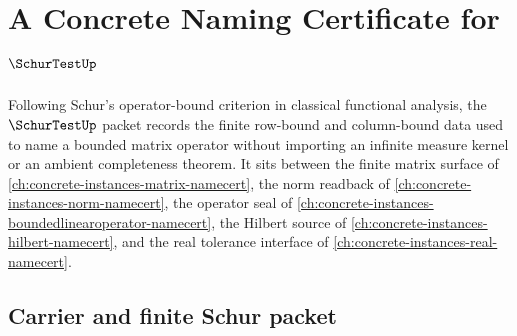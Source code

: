 \chapter{A Concrete Naming Certificate for $\SchurTestUp$}
\label{ch:concrete-instances-schur-test-namecert}

Following Schur's operator-bound criterion in classical functional analysis, the $\SchurTestUp$ packet records the finite row-bound and column-bound data used to name a bounded matrix operator without importing an infinite measure kernel or an ambient completeness theorem. It sits between the finite matrix surface of \autoref{ch:concrete-instances-matrix-namecert}, the norm readback of \autoref{ch:concrete-instances-norm-namecert}, the operator seal of \autoref{ch:concrete-instances-boundedlinearoperator-namecert}, the Hilbert source of \autoref{ch:concrete-instances-hilbert-namecert}, and the real tolerance interface of \autoref{ch:concrete-instances-real-namecert}.

\section{Carrier and finite Schur packet}
\label{sec:schur-test-carrier}

